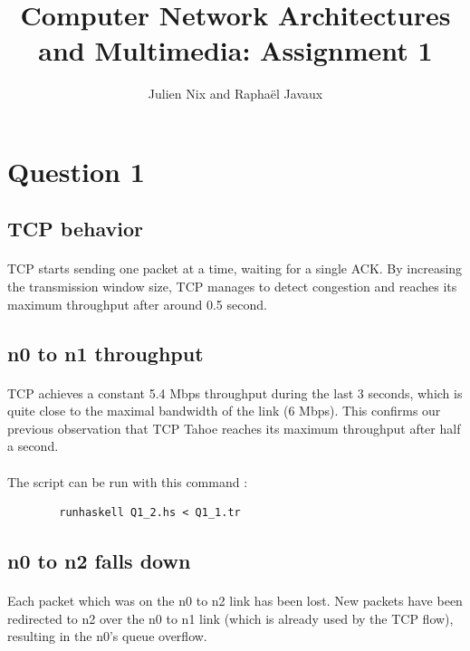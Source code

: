 \documentclass[a4paper]{article}
\title{Computer Network Architectures and Multimedia: Assignment 1}
\author{Julien Nix and Raphaël Javaux}
\date{}
\begin{document}
\maketitle

 \section{Question 1}

   \subsection{TCP behavior}

    \paragraph{}TCP starts sending one packet at a time, waiting for a single
ACK.
By increasing the transmission window size, TCP manages to detect congestion and
reaches its maximum throughput after around 0.5 second.

   \subsection{n0 to n1 throughput}

    \paragraph{}TCP achieves a constant 5.4 Mbps throughput during the last
3 seconds, which is quite close to the maximal bandwidth of the link (6 Mbps).
This confirms our previous observation that TCP Tahoe reaches its maximum
throughput after half a second.

    \paragraph{}The script can be run with this command :
    \begin{verbatim}
        runhaskell Q1_2.hs < Q1_1.tr
    \end{verbatim}

   \subsection{n0 to n2 falls down}

   \paragraph{}Each packet which was on the n0 to n2 link has been lost.
New packets have been redirected to n2 over the n0 to n1 link (which is already
used by the TCP flow), resulting in the n0's queue overflow.
\end{document}
